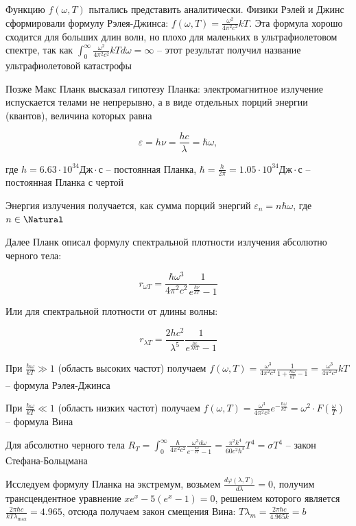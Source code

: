 Функцию $f(\omega, T)$ пытались представить аналитически. Физики Рэлей и Джинс сформировали формулу Рэлея-Джинса: $f(\omega, T) = \frac{\omega^2}{4\pi^2 c^2} kT$. Эта формула хорошо сходится для больших длин волн, но плохо для маленьких в ультрафиолетовом спектре, так как $\int_0^\infty \frac{\omega^2}{4\pi^2 c^2} kT d\omega = \infty$ -- этот результат получил название ультрафиолетовой катастрофы

Позже Макс Планк высказал гипотезу Планка: электромагнитное излучение испускается телами не непрерывно, а в виде отдельных порций энергии (квантов), величина которых равна 

\[\varepsilon = h \nu = \frac{h c}{\lambda} = \hbar \omega,\]

где $h = 6.63 \cdot 10^{34} \text{Дж}\cdot\text{с}$ -- постоянная Планка, $\hbar = \frac{h}{2\pi} = 1.05 \cdot 10^{34} \text{Дж}\cdot\text{с}$ -- постоянная Планка с чертой

Энергия излучения получается, как сумма порций энергий $\varepsilon_n = n \hbar \omega$, где $n \in \Natural$

Далее Планк описал формулу спектральной плотности излучения абсолютно черного тела:

\[r_{\omega T} = \frac{\hbar \omega^3}{4 \pi^2 c^2} \frac{1}{e^{\frac{h\nu}{kT}} - 1}\]

Или для спектральной плотности от длины волны:

\[r_{\lambda T} = \frac{2 h c^2}{\lambda^5} \frac{1}{e^{\frac{hc}{\lambda kT}} - 1}\]

При $\frac{\hbar \omega}{kT} \gg 1$ (область высоких частот) получаем $f(\omega, T) = \frac{\omega^3}{4\pi^2 c^2} \frac{1}{1 + \frac{\hbar \omega}{kT} - 1} = \frac{\omega^3}{4\pi^2 c^2} kT$ -- формула Рэлея-Джинса

При $\frac{\hbar \omega}{kT} \ll 1$ (область низких частот) получаем $f(\omega, T) = \frac{\omega^3}{4\pi^2 c^2} e^{-\frac{\hbar \omega}{k T}} = \omega^2 \cdot F\left(\frac{\omega}{T}\right)$ -- формула Вина

Для абсолютно черного тела $R_T = \int_0^\infty \frac{\hbar}{4\pi^2 c^2} \frac{\omega^3 d\omega}{e^{-\frac{\hbar \omega}{k T}} - 1} = \frac{\pi^2 k^4}{60 c^2 \hbar^3} T^4 = \sigma T^4$ -- закон Стефана-Больцмана

\smallvspace 

Исследуем формулу Планка на экстремум, возьмем $\frac{d \varphi(\lambda, T)}{d\lambda} = 0$, получим трансцендентное уравнение $x e^x - 5(e^x - 1) = 0$, решением которого является $\frac{2\pi \hbar c}{k T \lambda_{\max}} = 4.965$, отсюда получаем закон смещения Вина: $T \lambda_m = \frac{2\pi \hbar c}{4.965 k} = b$

